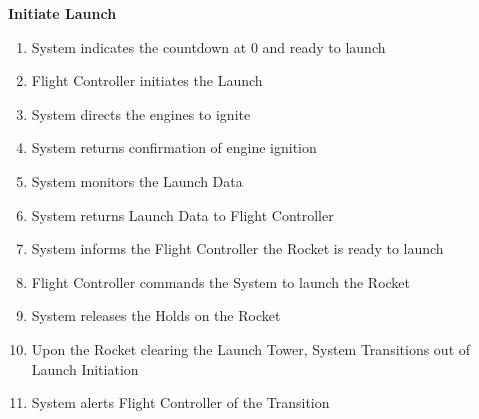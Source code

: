 \documentclass[letterpaper]{article}
\begin{document}
\noindent
\textbf{Initiate Launch}\\
\begin{enumerate}
\item System indicates the countdown at 0 and ready to launch
\item Flight Controller initiates the Launch
\item System directs the engines to ignite
\item System returns confirmation of engine ignition
\item System monitors the Launch Data
\item System returns Launch Data to Flight Controller
\item System informs the Flight Controller the Rocket is ready to
launch
\item Flight Controller commands the System to launch the Rocket
\item System releases the Holds on the Rocket
\item Upon the Rocket clearing the Launch Tower, System Transitions
out of Launch Initiation
\item System alerts Flight Controller of the Transition
\end{enumerate}
\end{document}
